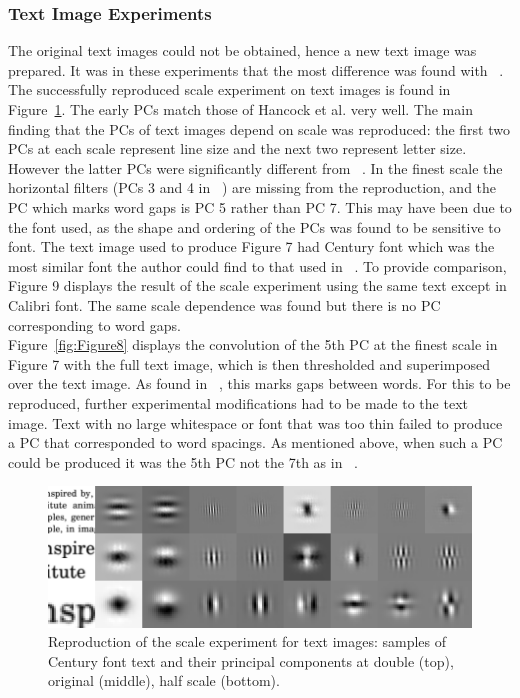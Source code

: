 \subsubsection{Text Image Experiments}
The original text images could not be obtained, hence a new text image was prepared. It was in these experiments that the most difference was found with ~\cite{Hancock1991-mp}.\\
The successfully reproduced scale experiment on text images is found in Figure~\ref{fig:Figure7}. The early PCs match those of Hancock et al. very well. The main finding that the PCs of text images depend on scale was reproduced: the first two PCs at each scale represent line size and the next two represent letter size. However the latter PCs were significantly different from ~\cite{Hancock1991-mp}. In the finest scale the horizontal filters (PCs 3 and 4 in ~\cite{Hancock1991-mp}) are missing from the reproduction, and the PC which marks word gaps is PC 5 rather than PC 7. This may have been due to the font used, as the shape and ordering of the PCs was found to be sensitive to font. The text image used to produce Figure 7 had Century font which was the most similar font the author could find to that used in ~\cite{Hancock1991-mp}. To provide comparison, Figure 9 displays the result of the scale experiment using the same text except in Calibri font. The same scale dependence was found but there is no PC corresponding to word gaps.\\
Figure~\ref{fig:Figure8} displays the convolution of the 5th PC at the finest scale in Figure 7 with the full text image, which is then thresholded and superimposed over the text image. As found in ~\cite{Hancock1991-mp}, this marks gaps between words. For this to be reproduced, further experimental modifications had to be made to the text image. Text with no large whitespace or font that was too thin failed to produce a PC that corresponded to word spacings. As mentioned above, when such a PC could be produced it was the 5th PC not the 7th as in ~\cite{Hancock1991-mp}. 
\begin{figure}
    \centering
    \includegraphics[scale=0.34]{figures/julia-fig7.png}
    \caption{Reproduction of the scale experiment for text images: samples of Century font text and their principal components at double (top), original (middle), half scale (bottom).}
    \label{fig:Figure7}
\end{figure}
